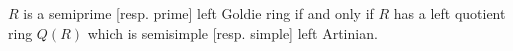 $R$ is a semiprime [resp. prime] left Goldie ring if and only if $R$ has a left quotient ring $Q(R)$ which is semisimple [resp. simple] left Artinian.
